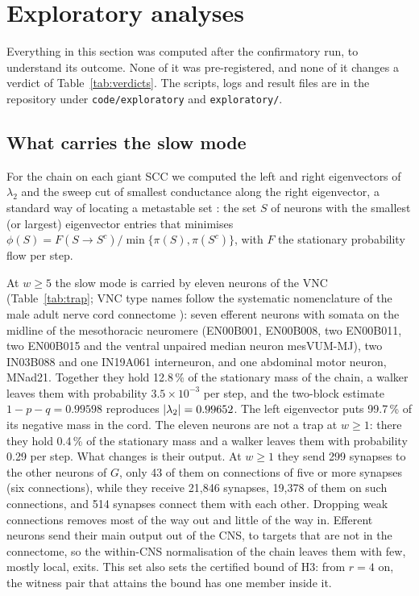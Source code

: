 \section{Exploratory analyses}\label{sec:explore}

Everything in this section was computed after the confirmatory run, to understand its outcome. None
of it was pre-registered, and none of it changes a verdict of Table~\ref{tab:verdicts}. The scripts,
logs and result files are in the repository under \texttt{code/exploratory} and
\texttt{exploratory/}.

\subsection{What carries the slow mode}\label{sec:slow}

For the chain on each giant SCC we computed the left and right eigenvectors of $\lambda_2$ and the
sweep cut of smallest conductance along the right eigenvector, a standard way of locating a
metastable set \cite{chung2005,deuflhard2005}: the set $S$ of neurons with the smallest (or
largest) eigenvector entries that minimises
$\phi(S)=F(S\to S^c)/\min\{\pi(S),\pi(S^c)\}$, with $F$ the stationary probability flow per step.

At $w\ge5$ the slow mode is carried by eleven neurons of the VNC (Table~\ref{tab:trap}; VNC type
names follow the systematic nomenclature of the male adult nerve cord connectome
\cite{takemura2024,marin2024,cheong2026}): seven efferent neurons with somata on the midline of the mesothoracic neuromere (EN00B001, EN00B008,
two EN00B011, two EN00B015 and the ventral unpaired median neuron mesVUM-MJ), two IN03B088 and one
IN19A061 interneuron, and one abdominal motor neuron, MNad21. Together they hold 12.8\,\% of the
stationary mass of the chain, a walker leaves them with probability $3.5\times10^{-3}$ per step,
and the two-block estimate $1-p-q=0.99598$ reproduces $\lvert\lambda_2\rvert=0.99652$. The left eigenvector
puts 99.7\,\% of its negative mass in the cord. The eleven neurons are not a trap at $w\ge1$: there
they hold 0.4\,\% of the stationary mass and a walker leaves them with probability 0.29 per step.
What changes is their output. At $w\ge1$ they send 299 synapses to the other neurons of $G$, only 43 of
them on connections of five or more synapses (six connections), while they receive 21{,}846 synapses,
19{,}378 of them on such connections, and 514 synapses connect them with each other. Dropping weak
connections removes most of the way out and little of the way in. Efferent neurons send their main output out of the CNS, to targets that are not in the
connectome, so the within-CNS normalisation of the chain leaves them with few, mostly local, exits.
This set also sets the certified bound of H3: from $r=4$ on, the witness pair that attains the
bound has one member inside it.

